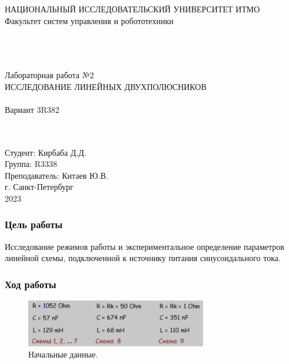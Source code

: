 \documentclass[12pt]{article}
\begin{document}
\begin{titlepage}
\begin{center}
    НАЦИОНАЛЬНЫЙ ИССЛЕДОВАТЕЛЬСКИЙ УНИВЕРСИТЕТ ИТМО \\
    Факультет систем управления и робототехники \\
    \vspace*{10\baselineskip}
    {} \\
    \ \\
    \ \\
    \begin{spacing}{1.5}
    {\large Лабораторная работа №2 \\
    ИССЛЕДОВАНИЕ ЛИНЕЙНЫХ ДВУХПОЛЮСНИКОВ \\
    \ \\
    Вариант 3R382}
    \end{spacing} \\
    \ \\
    \vspace*{10\baselineskip}
    \hfill {Студент: Кирбаба Д.Д.\ \ \ \ \ \ \ \ \ } \\
    \hfill {Группа: R3338\ \ \ \ \ \ \ \ \ \ \ \ \ \ \ \ \ \ \ \ \ } \\
    \hfill {Преподаватель: Китаев Ю.В.} \\
    \mbox{}
    \vfill {г. Санкт-Петербург\\2023}
\end{center}
\end{titlepage}

\subsubsection*{Цель работы}
Исследование режимов работы и экспериментальное определение параметров линейной схемы, подключенной к источнику питания синусоидального тока.

\subsubsection*{Ход работы}
\begin{figure}[H]
    \centering
    \includegraphics[width=0.7\textwidth]{initial_data.png}
    \caption{Начальные данные.}
    \label{fig:initial_data}
\end{figure}
\end{document}
